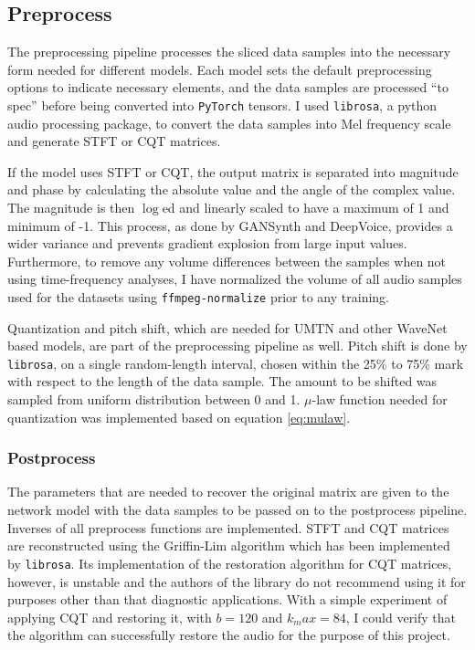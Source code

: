\documentclass[]{report}
\begin{document}
\hypertarget{preprocess}{%
\subsection{Preprocess}\label{preprocess}}

The preprocessing pipeline processes the sliced data samples into the
necessary form needed for different models. Each model sets the default
preprocessing options to indicate necessary elements, and the data
samples are processed ``to spec'' before being converted into
\texttt{PyTorch} tensors. I used \texttt{librosa}, a python audio
processing package, to convert the data samples into Mel frequency scale
and generate STFT or CQT matrices.

If the model uses STFT or CQT, the output matrix is separated into
magnitude and phase by calculating the absolute value and the angle of
the complex value. The magnitude is then \(\log\)ed and linearly scaled
to have a maximum of 1 and minimum of -1. This process, as done by
GANSynth and DeepVoice, provides a wider variance and prevents gradient
explosion from large input values. Furthermore, to remove any volume
differences between the samples when not using time-frequency analyses,
I have normalized the volume of all audio samples used for the datasets
using \texttt{ffmpeg-normalize} prior to any training.

Quantization and pitch shift, which are needed for UMTN and other
WaveNet based models, are part of the preprocessing pipeline as well.
Pitch shift is done by \texttt{librosa}, on a single random-length
interval, chosen within the 25\% to 75\% mark with respect to the length
of the data sample. The amount to be shifted was sampled from uniform
distribution between 0 and 1. \(\mu\)-law function needed for
quantization was implemented based on equation \ref{eq:mulaw}.

\hypertarget{postprocess}{%
\subsubsection{Postprocess}\label{postprocess}}

The parameters that are needed to recover the original matrix are given
to the network model with the data samples to be passed on to the
postprocess pipeline. Inverses of all preprocess functions are
implemented. STFT and CQT matrices are reconstructed using the
Griffin-Lim algorithm which has been implemented by \texttt{librosa}.
Its implementation of the restoration algorithm for CQT matrices,
however, is unstable and the authors of the library do not recommend
using it for purposes other than that diagnostic applications. With a
simple experiment of applying CQT and restoring it, with \(b = 120\) and
\(k_max = 84\), I could verify that the algorithm can successfully
restore the audio for the purpose of this project.
\end{document}
